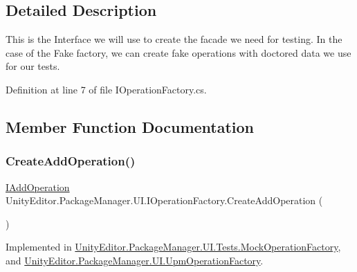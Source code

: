 \subsection{Detailed Description}
This is the Interface we will use to create the facade we need for testing. In the case of the Fake factory, we can create fake operations with doctored data we use for our tests. 



Definition at line 7 of file I\+Operation\+Factory.\+cs.



\subsection{Member Function Documentation}
\mbox{\label{interface_unity_editor_1_1_package_manager_1_1_u_i_1_1_i_operation_factory_a50ed4e82d0709f835d61b47331a464ac}} 
\subsubsection{\texorpdfstring{CreateAddOperation()}{CreateAddOperation()}}
{\footnotesize\ttfamily \mbox{\hyperlink{interface_unity_editor_1_1_package_manager_1_1_u_i_1_1_i_add_operation}{I\+Add\+Operation}} Unity\+Editor.\+Package\+Manager.\+U\+I.\+I\+Operation\+Factory.\+Create\+Add\+Operation (\begin{DoxyParamCaption}{ }\end{DoxyParamCaption})}



Implemented in \mbox{\hyperlink{class_unity_editor_1_1_package_manager_1_1_u_i_1_1_tests_1_1_mock_operation_factory_a9c4cf5b39d2c0b78864aa0609a60a21d}{Unity\+Editor.\+Package\+Manager.\+U\+I.\+Tests.\+Mock\+Operation\+Factory}}, and \mbox{\hyperlink{class_unity_editor_1_1_package_manager_1_1_u_i_1_1_upm_operation_factory_a567651d9dbfbb83813ae45768ab31e4e}{Unity\+Editor.\+Package\+Manager.\+U\+I.\+Upm\+Operation\+Factory}}.

\mbox{\label{interface_unity_editor_1_1_package_manager_1_1_u_i_1_1_i_operation_factory_a4a8dc6a8401962d62f9fe1e4eb83cde6}} 

